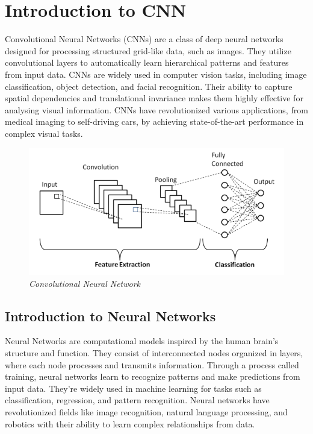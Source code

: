 \documentclass[12pt, a4paper]{report}
\begin{document}
\section{Introduction to CNN}
Convolutional Neural Networks (CNNs) are a class of deep neural networks designed for processing structured grid-like data, such as images. They utilize convolutional layers to automatically learn hierarchical patterns and features from input data. CNNs are widely used in computer vision tasks, including image classification, object detection, and facial recognition. Their ability to capture spatial dependencies and translational invariance makes them highly effective for analysing visual information. CNNs have revolutionized various applications, from medical imaging to self-driving cars, by achieving state-of-the-art performance in complex visual tasks.

\begin{figure}[htbp]
    \centering
    \includegraphics[width=1\textwidth]{report images/image2.png}
    \caption{\textit{Convolutional Neural Network}}
\end{figure}
\subsection{Introduction to Neural Networks}
Neural Networks are computational models inspired by the human brain's structure and function. They consist of interconnected nodes organized in layers, where each node processes and transmits information. Through a process called training, neural networks learn to recognize patterns and make predictions from input data. They're widely used in machine learning for tasks such as classification, regression, and pattern recognition. Neural networks have revolutionized fields like image recognition, natural language processing, and robotics with their ability to learn complex relationships from data.\\
\end{document}
